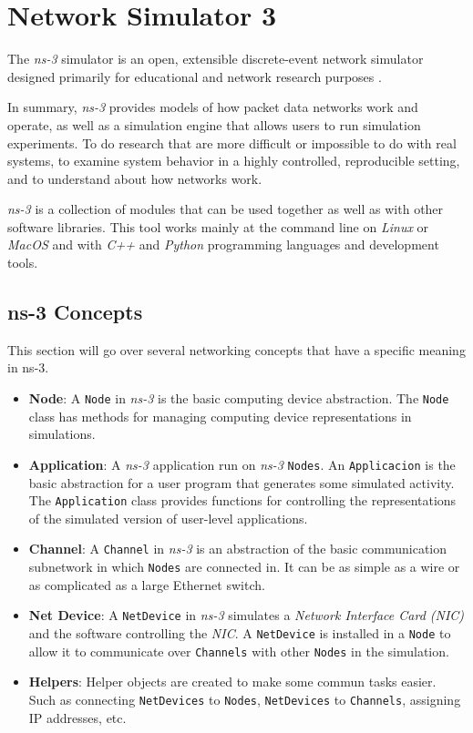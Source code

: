 \chapter{Network Simulator 3}
\label{chap:ns3}

The \textit{ns-3} simulator is an open, extensible discrete-event network simulator designed primarily 
for educational and network research purposes \cite{ns3}.

In summary, \textit{ns-3} provides models of how packet data networks work and operate, as well as a 
simulation engine that allows users to run simulation experiments. To do research that are 
more difficult or impossible to do with real systems, to examine system behavior in a highly 
controlled, reproducible setting, and to understand about how networks work.

\textit{ns-3} is a collection of modules that can be used together as well as with other software 
libraries. This tool works mainly at the command line on \textit{Linux} or \textit{MacOS} and with 
\textit{C++} and \textit{Python} programming languages and development tools.

\section{ns-3 Concepts}
\label{sec:ns3conc}
This section will go over several networking concepts that have a specific meaning in ns-3.

\begin{itemize}[topsep=0pt]
  \item[] \textbf{Node}: A \texttt{Node} in \textit{ns-3} is the basic computing device abstraction. 
  The \texttt{Node} class has methods for managing computing device representations in simulations.
  \item[] \textbf{Application}: A \textit{ns-3} application run on \textit{ns-3} \texttt{Nodes}. An 
  \texttt{Applicacion} is the basic abstraction for a user program that generates some simulated activity.  
  The \texttt{Application} class provides functions for controlling the representations of the simulated
  version of user-level applications.
  \item[] \textbf{Channel}: A \texttt{Channel} in \textit{ns-3} is an abstraction of the basic communication 
  subnetwork in which \texttt{Nodes} are connected in. It can be as simple as a wire or as complicated as a
  large Ethernet switch.
  \item[] \textbf{Net Device}: A \texttt{NetDevice} in \textit{ns-3} simulates a \textit{Network Interface Card (NIC)}
  and the software controlling the \textit{NIC}. A \texttt{NetDevice} is installed in a \texttt{Node} to allow 
  it to communicate over \texttt{Channels} with other \texttt{Nodes} in the simulation.
  \item[] \textbf{Helpers}: Helper objects are created to make some commun tasks easier. Such as connecting
  \texttt{NetDevices} to \texttt{Nodes}, \texttt{NetDevices} to \texttt{Channels}, assigning IP addresses, etc. 
\end{itemize}

